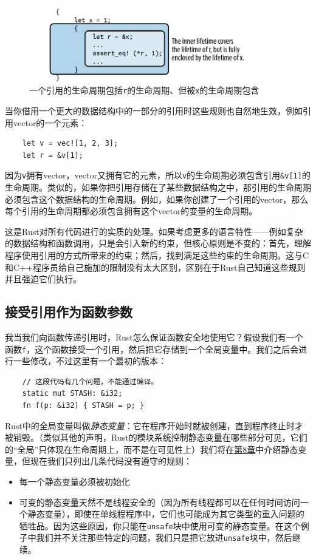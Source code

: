 \begin{figure}[htbp]
    \centering
    \includegraphics[width=0.9\textwidth]{../img/f5-6.png}
    \caption{一个引用的生命周期包括\texttt{r}的生命周期、但被\texttt{x}的生命周期包含}
    \label{f5-6}
\end{figure}

当你借用一个更大的数据结构中的一部分的引用时这些规则也自然地生效，例如引用vector的一个元素：
\begin{verbatim}
    let v = vec![1, 2, 3];
    let r = &v[1];
\end{verbatim}

因为\texttt{v}拥有vector，vector又拥有它的元素，所以\texttt{v}的生命周期必须包含引用\texttt{\&v[1]}的生命周期。类似的，如果你把引用存储在了某些数据结构之中，那引用的生命周期必须包含这个数据结构的生命周期。例如，如果你创建了一个引用的vector，那么每个引用的生命周期都必须包含拥有这个vector的变量的生命周期。

这是Rust对所有代码进行的实质的处理。如果考虑更多的语言特性——例如复杂的数据结构和函数调用，只是会引入新的约束，但核心原则是不变的：首先，理解程序使用引用的方式所带来的约束；然后，找到满足这些约束的生命周期。这与C和C++程序员给自己施加的限制没有太大区别，区别在于Rust自己知道这些规则并且强迫它们执行。

\subsection{接受引用作为函数参数}

我当我们向函数传递引用时，Rust怎么保证函数安全地使用它？假设我们有一个函数\texttt{f}，这个函数接受一个引用，然后把它存储到一个全局变量中。我们之后会进行一些修改，不过这里有一个最初的版本：
\begin{verbatim}
    // 这段代码有几个问题，不能通过编译。
    static mut STASH: &i32;
    fn f(p: &i32) { STASH = p; }
\end{verbatim}

Rust中的全局变量叫做\emph{静态变量}：它在程序开始时就被创建，直到程序终止时才被销毁。（类似其他的声明，Rust的模块系统控制静态变量在哪些部分可见，它们的“全局”只体现在生命周期上，而不是在可见性上）我们将在\hyperref[ch08]{第8章}中介绍静态变量，但现在我们只列出几条代码没有遵守的规则：
\begin{itemize}
    \item 每一个静态变量必须被初始化
    \item 可变的静态变量天然不是线程安全的（因为所有线程都可以在任何时间访问一个静态变量），即使在单线程程序中，它们也可能成为其它类型的重入问题的牺牲品。因为这些原因，你只能在\texttt{unsafe}块中使用可变的静态变量。在这个例子中我们并不关注那些特定的问题，我们只是把它放进\texttt{unsafe}块中，然后继续。
\end{itemize}

